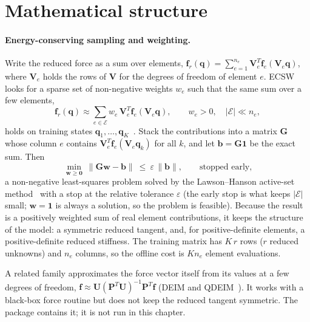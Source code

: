 \section{Mathematical structure}\label{sec:hy-math}

\paragraph{Energy-conserving sampling and weighting.}
Write the reduced force as a sum over elements, $\bm f_r(\bm q)=\sum_{e=1}^{n_e}\bm V_e^T\bm f_e(\bm V_e\bm q)$, where $\bm V_e$ holds the rows of $\bm V$ for the degrees of freedom of element $e$. ECSW looks for a sparse set of non-negative weights $w_e$ such that the same sum over a few elements,
\begin{equation}\label{eq:hy-ecsw}
\bm f_r(\bm q)\approx\sum_{e\in\mathcal E}w_e\,\bm V_e^T\bm f_e(\bm V_e\bm q),\qquad w_e>0,\quad |\mathcal E|\ll n_e,
\end{equation}
holds on training states $\bm q_1,\dots,\bm q_K$~\cite{farhat2014ecsw,farhat2015ecsw}. Stack the contributions into a matrix $\bm G$ whose column $e$ contains $\bm V_e^T\bm f_e(\bm V_e\bm q_k)$ for all $k$, and let $\bm b=\bm G\bm 1$ be the exact sum. Then
\begin{equation}\label{eq:hy-nnls}
\min_{\bm w\ge\bm 0}\ \|\bm G\bm w-\bm b\|\ \le\ \varepsilon\,\|\bm b\|,\qquad \text{stopped early,}
\end{equation}
a non-negative least-squares problem solved by the Lawson--Hanson active-set method~\cite{lawson1995lsq} with a stop at the relative tolerance $\varepsilon$ (the early stop is what keeps $|\mathcal E|$ small; $\bm w=\bm 1$ is always a solution, so the problem is feasible). Because the result is a positively weighted sum of real element contributions, it keeps the structure of the model: a symmetric reduced tangent, and, for positive-definite elements, a positive-definite reduced stiffness. The training matrix has $K\,r$ rows ($r$ reduced unknowns) and $n_e$ columns, so the offline cost is $K n_e$ element evaluations.

A related family approximates the force vector itself from its values at a few degrees of freedom, $\bm f\approx\bm U(\bm P^T\bm U)^{-1}\bm P^T\bm f$ (DEIM and QDEIM~\cite{chaturantabut2010deim,drmac2016qdeim}). It works with a black-box force routine but does not keep the reduced tangent symmetric. The package contains it; it is not run in this chapter.

